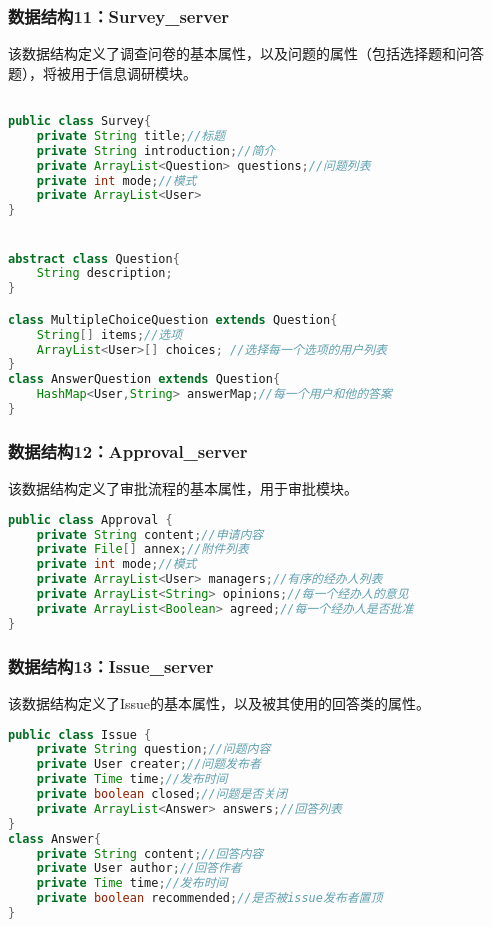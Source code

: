 {\color{red}

\subsubsection{数据结构11：Survey\_server}
该数据结构定义了调查问卷的基本属性，以及问题的属性（包括选择题和问答题），将被用于信息调研模块。
\begin{lstlisting}[language=Java, caption=Survey定义]

public class Survey{
    private String title;//标题
    private String introduction;//简介
    private ArrayList<Question> questions;//问题列表
    private int mode;//模式
    private ArrayList<User>  
}


abstract class Question{
    String description;
}

class MultipleChoiceQuestion extends Question{
    String[] items;//选项
    ArrayList<User>[] choices; //选择每一个选项的用户列表
}
class AnswerQuestion extends Question{
    HashMap<User,String> answerMap;//每一个用户和他的答案
}
\end{lstlisting}

\subsubsection{数据结构12：Approval\_server}
该数据结构定义了审批流程的基本属性，用于审批模块。
\begin{lstlisting}[language=Java, caption=Approval定义]
public class Approval {
    private String content;//申请内容
    private File[] annex;//附件列表
    private int mode;//模式
    private ArrayList<User> managers;//有序的经办人列表
    private ArrayList<String> opinions;//每一个经办人的意见
    private ArrayList<Boolean> agreed;//每一个经办人是否批准
}
\end{lstlisting}

\subsubsection{数据结构13：Issue\_server}
该数据结构定义了Issue的基本属性，以及被其使用的回答类的属性。

\begin{lstlisting}[language=Java, caption=Issue定义]
public class Issue {
    private String question;//问题内容
    private User creater;//问题发布者
    private Time time;//发布时间
    private boolean closed;//问题是否关闭
    private ArrayList<Answer> answers;//回答列表
}
class Answer{
    private String content;//回答内容
    private User author;//回答作者
    private Time time;//发布时间
    private boolean recommended;//是否被issue发布者置顶
}
\end{lstlisting}
}





